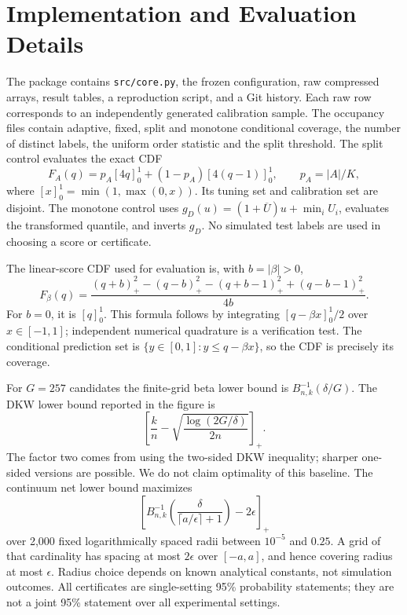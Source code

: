 \documentclass{article}
\begin{document}
\section{Implementation and Evaluation Details}\label{app:implementation}

The package contains \texttt{src/core.py}, the frozen configuration, raw compressed arrays, result tables, a reproduction script, and a Git history. Each raw row corresponds to an independently generated calibration sample. The occupancy files contain adaptive, fixed, split and monotone conditional coverage, the number of distinct labels, the uniform order statistic and the split threshold. The split control evaluates the exact CDF
\begin{equation}
 F_A(q)=p_A[4q]_0^1+(1-p_A)[4(q-1)]_0^1,\qquad p_A=|A|/K,
\end{equation}
where $[x]_0^1=\min(1,\max(0,x))$. Its tuning set and calibration set are disjoint. The monotone control uses $g_D(u)=(1+\overline U)u+\min_iU_i$, evaluates the transformed quantile, and inverts $g_D$. No simulated test labels are used in choosing a score or certificate.

The linear-score CDF used for evaluation is, with $b=|\beta|>0$,
\begin{equation}
 F_\beta(q)=\frac{(q+b)_+^2-(q-b)_+^2-(q+b-1)_+^2+(q-b-1)_+^2}{4b}.
\end{equation}
For $b=0$, it is $[q]_0^1$. This formula follows by integrating $[q-\beta x]_0^1/2$ over $x\in[-1,1]$; independent numerical quadrature is a verification test. The conditional prediction set is $\{y\in[0,1]:y\le q-\beta x\}$, so the CDF is precisely its coverage.

For $G=257$ candidates the finite-grid beta lower bound is $B_{n,k}^{-1}(\delta/G)$. The DKW lower bound reported in the figure is
\begin{equation}
 \left[\frac{k}{n}-\sqrt{\frac{\log(2G/\delta)}{2n}}\right]_+.
\end{equation}
The factor two comes from using the two-sided DKW inequality; sharper one-sided versions are possible. We do not claim optimality of this baseline. The continuum net lower bound maximizes
\begin{equation}
 \left[B_{n,k}^{-1}\left(\frac{\delta}{\lceil a/\epsilon\rceil+1}\right)-2\epsilon\right]_+
\end{equation}
over 2,000 fixed logarithmically spaced radii between $10^{-5}$ and $0.25$. A grid of that cardinality has spacing at most $2\epsilon$ over $[-a,a]$, and hence covering radius at most $\epsilon$. Radius choice depends on known analytical constants, not simulation outcomes. All certificates are single-setting 95\% probability statements; they are not a joint 95\% statement over all experimental settings.
\end{document}

